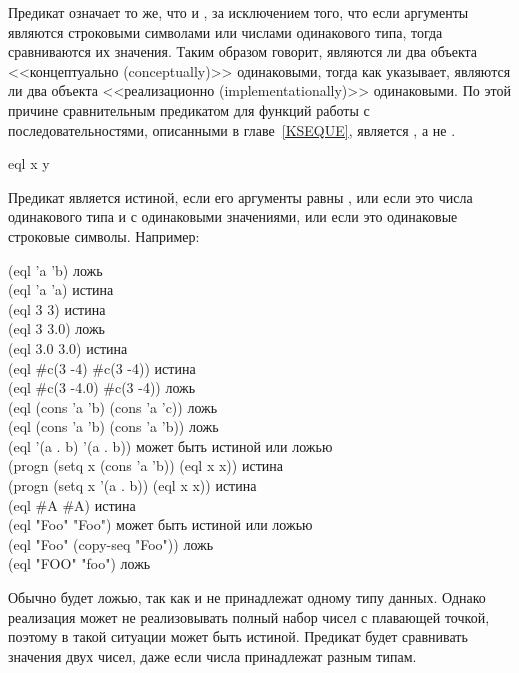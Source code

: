 \begin{defun}[Функция]
Предикат  означает то же, что и , за исключением того, что если
аргументы являются строковыми символами или числами одинакового типа, тогда
сравниваются их значения. Таким образом  говорит, являются ли два объекта
<<концептуально (conceptually)>> одинаковыми, тогда как  указывает, являются ли два
объекта <<реализационно (implementationally)>> одинаковыми. По этой причине
сравнительным предикатом для функций работы с последовательностями, описанными в
главе~\ref{KSEQUE}, является , а не .
\end{defun}

\begin{defun}[Функция]
eql x y

Предикат  является истиной, если его аргументы равны , или 
если это числа одинакового типа и с одинаковыми значениями, или если это
одинаковые строковые символы.
Например:
\begin{lisp}
(eql 'a 'b) \textrm{ложь} \\
(eql 'a 'a) \textrm{истина} \\
(eql 3 3) \textrm{истина} \\
(eql 3 3.0) \textrm{ложь} \\
(eql 3.0 3.0) \textrm{истина} \\
(eql \#c(3 -4) \#c(3 -4)) \textrm{истина} \\
(eql \#c(3 -4.0) \#c(3 -4)) \textrm{ложь} \\
(eql (cons 'a 'b) (cons 'a 'c)) \textrm{ложь} \\
(eql (cons 'a 'b) (cons 'a 'b)) \textrm{ложь} \\
(eql '(a . b) '(a . b)) \textrm{может быть истиной или ложью} \\
(progn (setq x (cons 'a 'b)) (eql x x)) \textrm{истина} \\
(progn (setq x '(a . b)) (eql x x)) \textrm{истина} \\
(eql \#{\Xbackslash}A \#{\Xbackslash}A) \textrm{истина} \\
(eql "Foo" "Foo") \textrm{может быть истиной или ложью} \\
(eql "Foo" (copy-seq "Foo")) \textrm{ложь} \\
(eql "FOO" "foo") \textrm{ложь}
\end{lisp}

Обычно  будет ложью, так как  и  не
принадлежат одному типу данных. Однако реализация может не реализовывать полный
набор чисел с плавающей точкой, поэтому в такой ситуации 
может быть истиной. Предикат \cdf{=} будет сравнивать значения двух чисел, даже
если числа принадлежат разным типам.


\end{defun}
